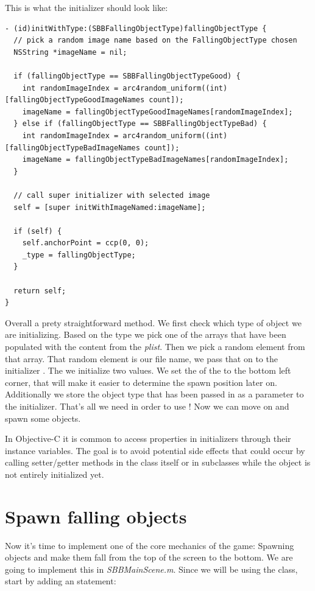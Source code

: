 This is what the initializer should look like:
\begin{lstlisting}
- (id)initWithType:(SBBFallingObjectType)fallingObjectType {
  // pick a random image name based on the FallingObjectType chosen
  NSString *imageName = nil;
  
  if (fallingObjectType == SBBFallingObjectTypeGood) {
    int randomImageIndex = arc4random_uniform((int)[fallingObjectTypeGoodImageNames count]);
    imageName = fallingObjectTypeGoodImageNames[randomImageIndex];
  } else if (fallingObjectType == SBBFallingObjectTypeBad) {
    int randomImageIndex = arc4random_uniform((int)[fallingObjectTypeBadImageNames count]);
    imageName = fallingObjectTypeBadImageNames[randomImageIndex];
  }
  
  // call super initializer with selected image
  self = [super initWithImageNamed:imageName];
  
  if (self) {
    self.anchorPoint = ccp(0, 0);
    _type = fallingObjectType;
  }
  
  return self;
}
\end{lstlisting}
Overall a prety straightforward method. We first check which type of object we
are initializing. Based on the type we pick one of the arrays that have been
populated with the content from the \textit{plist}. Then we pick a random
element from that array. That random element is our file name, we pass that on
to the \ccsprite{} initializer . The we
initialize two values. We set the  of the
 to the bottom left corner, that will make it
easier to determine the spawn position later on. Additionally we store the
object type that has been passed in as a parameter to the initializer.
That's all we need in order to use ! Now we can
move on and spawn some objects.

\begin{details}[frametitle={Accessing properties
in initializers}] In Objective-C it is common to access properties in initializers through their
instance variables. The goal is to avoid potential side effects that could
occur by calling setter/getter methods in the class itself or in subclasses
while the object is not entirely initialized yet.
\end{details}

\section{Spawn falling objects}
Now it's time to implement one of the core mechanics of the game: Spawning
objects and make them fall from the top of the screen to the bottom. We are
going to implement this in \textit{SBBMainScene.m}. Since we will be using the
 class, start by adding an 
statement:

